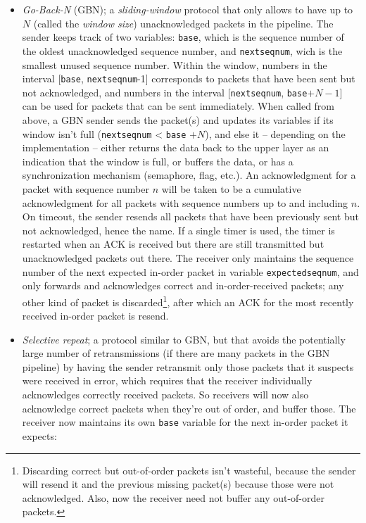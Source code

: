 \documentclass[8pt, table, xcdraw]{article}%
\begin{document}
\begin{enumerate}
    \begin{itemize}
        \item \emph{Go-Back-N} (GBN); a \emph{sliding-window} protocol that only allows to have up to $N$ (called the \emph{window size}) unacknowledged packets in the pipeline. The sender keeps track of two variables: \texttt{base}, which is the sequence number of the oldest unacknowledged sequence number, and \texttt{nextseqnum}, wich is the smallest unused sequence number. Within the window, numbers in the interval [\texttt{base}, \texttt{nextseqnum}-1] corresponds to packets that have been sent but not acknowledged, and numbers in the interval [\texttt{nextseqnum}, \texttt{base}$+N-1$] can be used for packets that can be sent immediately. When called from above, a GBN sender sends the packet(s) and updates its variables if its window isn't full (\texttt{nextseqnum} < \texttt{base} $+ N$), and else it -- depending on the implementation -- either returns the data back to the upper layer as an indication that the window is full, or buffers the data, or has a synchronization mechanism (semaphore, flag, etc.). An acknowledgment for a packet with sequence number $n$ will be taken to be a cumulative acknowledgment for all packets with sequence numbers up to and including $n$. On timeout, the sender resends all packets that have been previously sent but not acknowledged, hence the name. If a single timer is used, the timer is restarted when an ACK is received but there are still transmitted but unacknowledged packets out there. The receiver only maintains the sequence number of the next expected in-order packet in variable \texttt{expectedseqnum}, and only forwards and acknowledges correct and in-order-received packets; any other kind of packet is discarded\footnote{Discarding correct but out-of-order packets isn't wasteful, because the sender will resend it and the previous missing packet(s) because those were not acknowledged. Also, now the receiver need not buffer any out-of-order packets.}, after which an ACK for the most recently received in-order packet is resend.
        \item \emph{Selective repeat}; a protocol similar to GBN, but that avoids the potentially large number of retransmissions (if there are many packets in the GBN pipeline) by having the sender retransmit only those packets that it suspects were received in error, which requires that the receiver individually acknowledges correctly received packets. So receivers will now also acknowledge correct packets when they're out of order, and buffer those. The receiver now maintains its own \texttt{base} variable for the next in-order packet it expects:

\end{itemize}
\end{enumerate}
\end{document}
